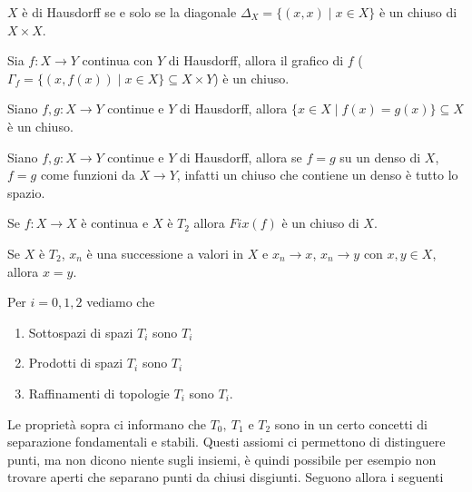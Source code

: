 \begin{multicols*}{2}
\begin{proposition}\label{CaratterizzazioneT2}
$X$ è di Hausdorff se e solo se la diagonale $\Delta_X=\{(x,x)\mid x\in X\}$ è un chiuso di $X\times X$.
\end{proposition}
\begin{corollary}
Sia $f:X\to Y$ continua con $Y$ di Hausdorff, allora il grafico di $f$ ($\Gamma_f=\{(x,f(x))\mid x\in X\}\subseteq X\times Y$) è un chiuso.
\end{corollary}
\begin{corollary}
Siano $f,g:X\to Y$ continue e $Y$ di Hausdorff, allora $\{x\in X\mid f(x)=g(x)\}\subseteq X$ è un chiuso.
\end{corollary}
\begin{corollary}
Siano $f,g:X\to Y$ continue e $Y$ di Hausdorff, allora se $f=g$ su un denso di $X$, $f=g$ come funzioni da $X\to Y$, infatti un chiuso che contiene un denso è tutto lo spazio.
\end{corollary}
\begin{corollary}
Se $f:X\to X$ è continua e $X$ è $T_2$ allora $Fix(f)$ è un chiuso di $X$.
\end{corollary}

\begin{theorem}\label{LimiteUnicoSeHausdorff}
Se $X$ è $T_2$, $x_n$ è una successione a valori in $X$ e $x_n\to x$, $x_n\to y$ con $x,y\in X$, allora $x=y$.
\end{theorem}
\begin{proposition}
Per $i=0,1,2$ vediamo che
\begin{enumerate}[noitemsep]
\item Sottospazi di spazi $T_i$ sono $T_i$
\item Prodotti di spazi $T_i$ sono $T_i$
\item Raffinamenti di topologie $T_i$ sono $T_i$.
\end{enumerate}
\end{proposition}
\noindent Le proprietà sopra ci informano che $T_0,\ T_1$ e $T_2$ sono in un certo concetti di separazione fondamentali e stabili. Questi assiomi ci permettono di distinguere punti, ma non dicono niente sugli insiemi, è quindi possibile per esempio non trovare aperti che separano punti da chiusi disgiunti. Seguono allora i seguenti


\end{multicols*}
